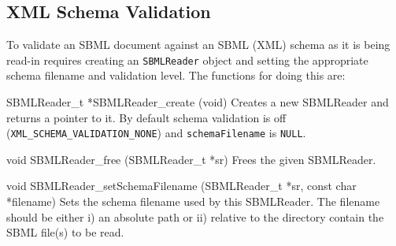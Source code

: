 \documentclass{sbmlmanual}
\begin{document}
%


\subsection{XML Schema Validation}
\label{sec:schema-validation}

To validate an SBML document against an SBML (XML) schema as it is
being read-in requires creating an \texttt{SBMLReader} object and
setting the appropriate schema filename and validation level.  The
functions for doing this are:


\begin{methoddef}{SBMLReader\_t *SBMLReader\_create (void)}
  Creates a new SBMLReader and returns a pointer to it.  By default
  schema validation is off (\texttt{XML\_SCHEMA\_VALIDATION\_NONE})
  and \texttt{schemaFilename} is \texttt{NULL}.
\end{methoddef}

\begin{methoddef}{void SBMLReader\_free (SBMLReader\_t *sr)}
  Frees the given SBMLReader.
\end{methoddef}

\begin{methoddef}{void SBMLReader\_setSchemaFilename (SBMLReader\_t *sr,
const char *filename)} Sets the schema filename used by this
  SBMLReader.  The filename should be either i) an absolute path or
  ii) relative to the directory contain the SBML file(s) to be read.
\end{methoddef}
\end{document}
